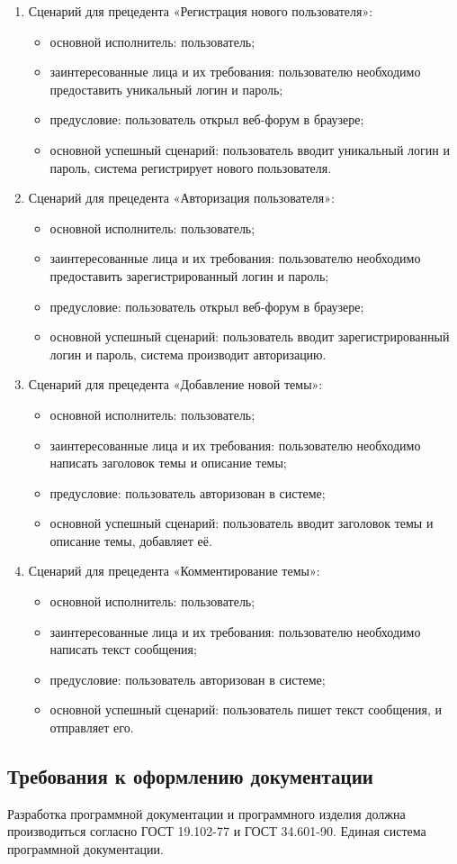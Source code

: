 \begin{enumerate}
	\item Сценарий для прецедента «Регистрация нового пользователя»:
	\begin{itemize}
		\item основной исполнитель: пользователь;
		\item заинтересованные лица и их требования: пользователю необходимо предоставить уникальный логин и пароль;
		\item предусловие: пользователь открыл веб-форум в браузере;
		\item основной успешный сценарий: пользователь вводит уникальный логин и пароль, система регистрирует нового пользователя.
	\end{itemize}
	\item Сценарий для прецедента «Авторизация пользователя»:
	\begin{itemize}
		\item основной исполнитель: пользователь;
		\item заинтересованные лица и их требования: пользователю необходимо предоставить зарегистрированный логин и пароль;
		\item предусловие: пользователь открыл веб-форум в браузере;
		\item основной успешный сценарий: пользователь вводит зарегистрированный логин и пароль, система производит авторизацию.
	\end{itemize}
	
	\item Сценарий для прецедента «Добавление новой темы»:
	\begin{itemize}
		\item основной исполнитель: пользователь;
		\item заинтересованные лица и их требования: пользователю необходимо написать заголовок темы и описание темы;
		\item предусловие: пользователь авторизован в системе;
		\item основной успешный сценарий: пользователь вводит заголовок темы и описание темы, добавляет её.
	\end{itemize}
	
	\item Сценарий для прецедента «Комментирование темы»:
	\begin{itemize}
		\item основной исполнитель: пользователь;
		\item заинтересованные лица и их требования: пользователю необходимо написать текст сообщения;
		\item предусловие: пользователь авторизован в системе;
		\item основной успешный сценарий: пользователь пишет текст сообщения, и отправляет его.
	\end{itemize}
	
\end{enumerate}

\subsection{Требования к оформлению документации}

Разработка программной документации и программного изделия должна производиться согласно ГОСТ 19.102-77 и ГОСТ 34.601-90. Единая система программной документации.
